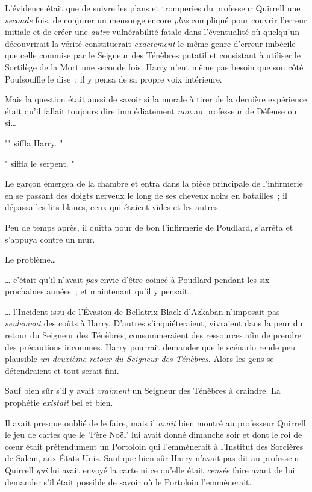 L'évidence était que de suivre les plans et tromperies du professeur Quirrell une \emph{seconde} fois, de conjurer un mensonge encore \emph{plus} compliqué pour couvrir l'erreur initiale et de créer une \emph{autre} vulnérabilité fatale dans l'éventualité où quelqu'un découvrirait la vérité constituerait \emph{exactement} le même genre d'erreur imbécile que celle commise par le Seigneur des Ténèbres putatif et consistant à utiliser le Sortilège de la Mort une seconde fois. Harry n'eut même pas besoin que son côté Poufsouffle le dise~: il y pensa de sa propre voix intérieure.

Mais la question était aussi de savoir si la morale à tirer de la dernière expérience était qu'il fallait toujours dire immédiatement \emph{non} au professeur de Défense ou si…

"" siffla Harry. "

" siffla le serpent. "

\later

Le garçon émergea de la chambre et entra dans la pièce principale de l'infirmerie en se passant des doigts nerveux le long de ses cheveux noirs en batailles~; il dépassa les lits blancs, ceux qui étaient vides et les autres.

Peu de temps après, il quitta pour de bon l'infirmerie de Poudlard, s'arrêta et s'appuya contre un mur.

Le problème…

… c'était qu'il n'avait \emph{pas} envie d'être coincé à Poudlard pendant les six prochaines années~; et maintenant qu'il y pensait…

… l'Incident issu de l'Évasion de Bellatrix Black d'Azkaban n'imposait pas \emph{seulement} des coûts à Harry. D'autres s'inquiéteraient, vivraient dans la peur du retour du Seigneur des Ténèbres, consommeraient des ressources afin de prendre des précautions inconnues. Harry pourrait demander que le scénario rende peu plausible \emph{un deuxième retour du Seigneur des Ténèbres.} Alors les gens se détendraient et tout serait fini.

Sauf bien sûr s'il y avait \emph{vraiment} un Seigneur des Ténèbres à craindre. La prophétie \emph{existait} bel et bien.

Il avait presque oublié de le faire, mais il \emph{avait} bien montré au professeur Quirrell le jeu de cartes que le 'Père Noël' lui avait donné dimanche soir et dont le roi de cœur était prétendument un Portoloin qui l'emmènerait à l'Institut des Sorcières de Salem, aux États-Unis. Sauf que bien sûr Harry n'avait pas dit au professeur Quirrell \emph{qui} lui avait envoyé la carte ni ce qu'elle était \emph{censée} faire avant de lui demander s'il était possible de savoir où le Portoloin l'emmènerait.

